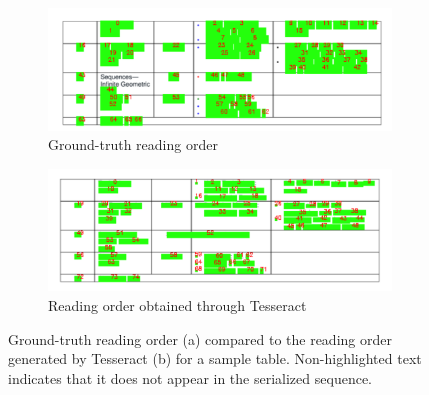 \begin{figure}[!htbp]
    \centering
    \small
      \begin{subfigure}[b]{\textwidth}
        \includegraphics[width=\textwidth]{images/chapter4/gold_tables.pdf}
        \caption{Ground-truth reading order}
      \end{subfigure}
      \begin{subfigure}[b]{\textwidth}
        \includegraphics[width=\textwidth]{images/chapter4/tesseract_tables.pdf}
        \caption{Reading order obtained through Tesseract}
      \end{subfigure}
    \caption{Ground-truth reading order (a) compared to the reading order generated by Tesseract (b) for a sample table. Non-highlighted text indicates that it does not appear in the serialized sequence.}
    \label{fig:reading-orders-table}
\end{figure}

